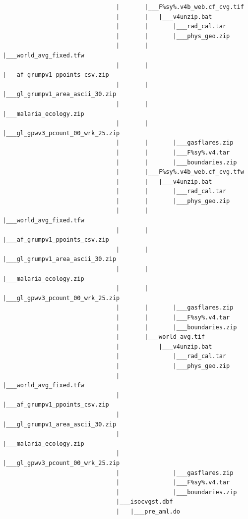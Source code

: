 \documentclass[]{book}
\begin{document}
\begin{verbatim}
                                |       |___F%sy%.v4b_web.cf_cvg.tif
                                |       |   |___v4unzip.bat
                                |       |       |___rad_cal.tar
                                |       |       |___phys_geo.zip
                                |       |       |___world_avg_fixed.tfw
                                |       |       |___af_grumpv1_ppoints_csv.zip
                                |       |       |___gl_grumpv1_area_ascii_30.zip
                                |       |       |___malaria_ecology.zip
                                |       |       |___gl_gpwv3_pcount_00_wrk_25.zip
                                |       |       |___gasflares.zip
                                |       |       |___F%sy%.v4.tar
                                |       |       |___boundaries.zip
                                |       |___F%sy%.v4b_web.cf_cvg.tfw
                                |       |   |___v4unzip.bat
                                |       |       |___rad_cal.tar
                                |       |       |___phys_geo.zip
                                |       |       |___world_avg_fixed.tfw
                                |       |       |___af_grumpv1_ppoints_csv.zip
                                |       |       |___gl_grumpv1_area_ascii_30.zip
                                |       |       |___malaria_ecology.zip
                                |       |       |___gl_gpwv3_pcount_00_wrk_25.zip
                                |       |       |___gasflares.zip
                                |       |       |___F%sy%.v4.tar
                                |       |       |___boundaries.zip
                                |       |___world_avg.tif
                                |           |___v4unzip.bat
                                |               |___rad_cal.tar
                                |               |___phys_geo.zip
                                |               |___world_avg_fixed.tfw
                                |               |___af_grumpv1_ppoints_csv.zip
                                |               |___gl_grumpv1_area_ascii_30.zip
                                |               |___malaria_ecology.zip
                                |               |___gl_gpwv3_pcount_00_wrk_25.zip
                                |               |___gasflares.zip
                                |               |___F%sy%.v4.tar
                                |               |___boundaries.zip
                                |___isocvgst.dbf
                                |   |___pre_aml.do

\end{verbatim}
\end{document}

